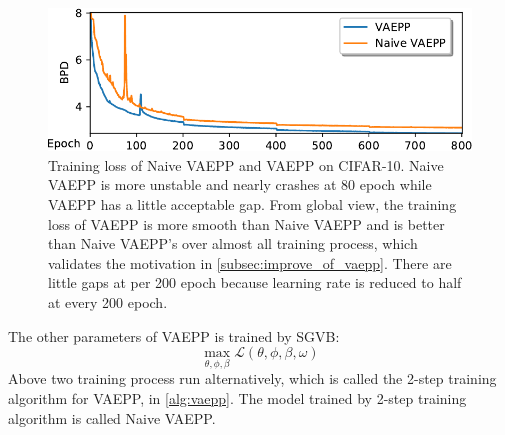 \begin{figure}[tb]
	\centering
	\includegraphics[width=1.0\columnwidth]{../dist.strip/loss_curves}
	\caption{
	Training loss of Naive VAEPP and VAEPP on CIFAR-10. Naive VAEPP is more unstable and nearly crashes at 80 epoch while VAEPP has a little acceptable gap. From global view, the training loss of VAEPP is more smooth than Naive VAEPP and is better than Naive VAEPP's over almost all training process, which validates the motivation in \cref{subsec:improve_of_vaepp}. There are little gaps at per 200 epoch because learning rate is reduced to half at every 200 epoch. 
	}
	\label{fig:loss_curves}
\end{figure}
The other parameters of VAEPP is trained by SGVB:
\begin{equation*}
	\max_{\theta, \phi, \beta} \mathcal{L}(\theta, \phi, \beta, \omega)
\end{equation*}
Above two training process run alternatively, which is called the 2-step training algorithm for VAEPP, in \cref{alg:vaepp}. The model trained by 2-step training algorithm is called Naive VAEPP. 
